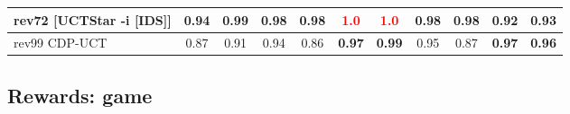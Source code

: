 \documentclass{article}
\begin{document}
\begin{tabular}{|l|r@{$\pm$}rr@{$\pm$}rr@{$\pm$}rr@{$\pm$}rr@{$\pm$}rr@{$\pm$}rr@{$\pm$}rr@{$\pm$}rr@{$\pm$}rr@{$\pm$}r|}
\\
rev72 [UCTStar -i [IDS]]
& \multicolumn{2}{c}{0.94}
& \multicolumn{2}{c}{0.99}
& \multicolumn{2}{c}{0.98}
& \multicolumn{2}{c}{0.98}
& \multicolumn{2}{c}{\textbf{\textcolor{red}{1.0}}}
& \multicolumn{2}{c}{\textbf{\textcolor{red}{1.0}}}
& \multicolumn{2}{c}{0.98}
& \multicolumn{2}{c}{0.98}
& \multicolumn{2}{c}{0.92}
& \multicolumn{2}{c|}{0.93}
\\
\hline
rev99 CDP-UCT
& \multicolumn{2}{c}{0.87}
& \multicolumn{2}{c}{0.91}
& \multicolumn{2}{c}{0.94}
& \multicolumn{2}{c}{0.86}
& \multicolumn{2}{c}{\textbf{0.97}}
& \multicolumn{2}{c}{\textbf{0.99}}
& \multicolumn{2}{c}{0.95}
& \multicolumn{2}{c}{0.87}
& \multicolumn{2}{c}{\textbf{0.97}}
& \multicolumn{2}{c|}{\textbf{0.96}}
\\
\hline
\end{tabular}%

\bigskip

\subsection*{Rewards: game}
\end{document}
